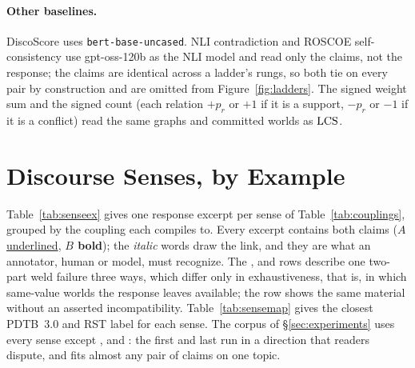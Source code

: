 \paragraph{Other baselines.} DiscoScore uses \texttt{bert-base-uncased}. NLI contradiction and
ROSCOE self-consistency use gpt-oss-120b as the NLI model and read only the claims, not the
response; the claims are identical across a ladder's rungs, so both tie on every pair by
construction and are omitted from Figure~\ref{fig:ladders}. The signed weight sum and the signed
count (each relation $+p_r$ or $+1$ if it is a support, $-p_r$ or $-1$ if it is a conflict) read
the same graphs and committed worlds as $\mathrm{LCS}$.

\section{Discourse Senses, by Example}
\label{app:senses}

Table~\ref{tab:senseex} gives one response excerpt per sense of Table~\ref{tab:couplings}, grouped
by the coupling each compiles to. Every excerpt contains both claims (\uline{$A$ underlined},
\textbf{$B$ bold}); the \emph{italic} words draw the link, and they are what an annotator, human or
model, must recognize. The ,  and  rows
describe one two-part weld failure three ways, which differ only in exhaustiveness, that is, in
which same-value worlds the response leaves available; the  row shows the same
material without an asserted incompatibility. Table~\ref{tab:sensemap} gives the closest PDTB~3.0
and RST label for each sense. The corpus of \S\ref{sec:experiments} uses every sense except
,  and : the first and last run in a
direction that readers dispute, and  fits almost any pair of claims on one
topic.

